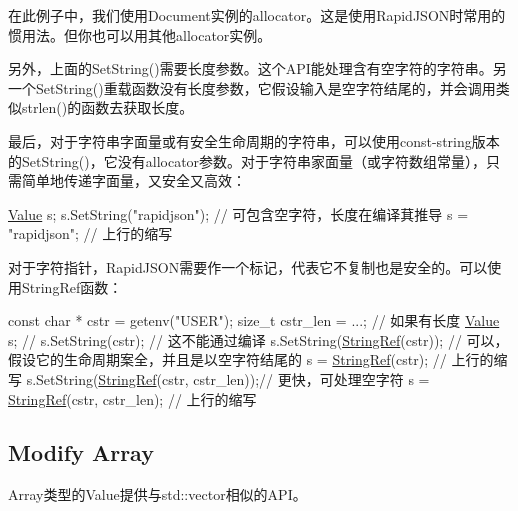在此例子中，我们使用{\ttfamily Document}实例的allocator。这是使用\+Rapid\+J\+S\+O\+N时常用的惯用法。但你也可以用其他allocator实例。

另外，上面的{\ttfamily Set\+String()}需要长度参数。这个\+A\+P\+I能处理含有空字符的字符串。另一个{\ttfamily Set\+String()}重载函数没有长度参数，它假设输入是空字符结尾的，并会调用类似{\ttfamily strlen()}的函数去获取长度。

最后，对于字符串字面量或有安全生命周期的字符串，可以使用const-\/string版本的{\ttfamily Set\+String()}，它没有allocator参数。对于字符串家面量（或字符数组常量），只需简单地传递字面量，又安全又高效：


\begin{DoxyCode}
\hyperlink{class_generic_value}{Value} s;
s.SetString(\textcolor{stringliteral}{"rapidjson"});    \textcolor{comment}{// 可包含空字符，长度在编译萁推导}
s = \textcolor{stringliteral}{"rapidjson"};             \textcolor{comment}{// 上行的缩写}
\end{DoxyCode}


对于字符指针，\+Rapid\+J\+S\+O\+N需要作一个标记，代表它不复制也是安全的。可以使用{\ttfamily String\+Ref}函数：


\begin{DoxyCode}
\textcolor{keyword}{const} \textcolor{keywordtype}{char} * cstr = getenv(\textcolor{stringliteral}{"USER"});
\textcolor{keywordtype}{size\_t} cstr\_len = ...;                 \textcolor{comment}{// 如果有长度}
\hyperlink{class_generic_value}{Value} s;
\textcolor{comment}{// s.SetString(cstr);                  // 这不能通过编译}
s.SetString(\hyperlink{struct_generic_string_ref_aa6b9fd9f6aa49405a574c362ba9af6b5}{StringRef}(cstr));          \textcolor{comment}{// 可以，假设它的生命周期案全，并且是以空字符结尾的}
s = \hyperlink{struct_generic_string_ref_aa6b9fd9f6aa49405a574c362ba9af6b5}{StringRef}(cstr);                   \textcolor{comment}{// 上行的缩写}
s.SetString(\hyperlink{struct_generic_string_ref_aa6b9fd9f6aa49405a574c362ba9af6b5}{StringRef}(cstr, cstr\_len));\textcolor{comment}{// 更快，可处理空字符}
s = \hyperlink{struct_generic_string_ref_aa6b9fd9f6aa49405a574c362ba9af6b5}{StringRef}(cstr, cstr\_len);         \textcolor{comment}{// 上行的缩写}
\end{DoxyCode}
\hypertarget{md_Commun_Externe_RapidJSON_doc_tutorial.zh-cn_ModifyArray}{}\subsection{Modify Array}\label{md_Commun_Externe_RapidJSON_doc_tutorial.zh-cn_ModifyArray}
Array类型的\+Value提供与{\ttfamily std\+::vector}相似的\+A\+P\+I。


